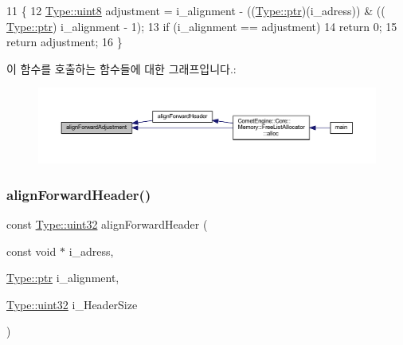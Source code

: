 \begin{DoxyCode}
11 \{
12     \hyperlink{namespace_comet_engine_1_1_type_a1b09856a6463f2bcc4bd8ff0e4e3ee0f}{Type::uint8} adjustment = i\_alignment - ((\hyperlink{namespace_comet_engine_1_1_type_aeb22ad46de677e9a50679dfebeb0e6f0}{Type::ptr})(i\_adress)) & ((
      \hyperlink{namespace_comet_engine_1_1_type_aeb22ad46de677e9a50679dfebeb0e6f0}{Type::ptr}) i\_alignment - 1);
13     \textcolor{keywordflow}{if} (i\_alignment == adjustment)
14         \textcolor{keywordflow}{return} 0;
15     \textcolor{keywordflow}{return} adjustment;
16 \}
\end{DoxyCode}
이 함수를 호출하는 함수들에 대한 그래프입니다.\+:
\nopagebreak
\begin{figure}[H]
\begin{center}
\leavevmode
\includegraphics[width=350pt]{namespace_comet_engine_1_1_core_1_1_memory_1_1_utils_aa5a0140d498d631a747be87791063f2d_icgraph}
\end{center}
\end{figure}
\mbox{\label{namespace_comet_engine_1_1_core_1_1_memory_1_1_utils_a57bbceefc56fa0e2ec1e472d85ce5e19}} 
\subsubsection{\texorpdfstring{align\+Forward\+Header()}{alignForwardHeader()}}
{\footnotesize\ttfamily const \hyperlink{namespace_comet_engine_1_1_type_ada4c95a4173a4bb540c8a7f80f3665d2}{Type\+::uint32} align\+Forward\+Header (\begin{DoxyParamCaption}\item[{const void $\ast$}]{i\+\_\+adress,  }\item[{\hyperlink{namespace_comet_engine_1_1_type_aeb22ad46de677e9a50679dfebeb0e6f0}{Type\+::ptr}}]{i\+\_\+alignment,  }\item[{\hyperlink{namespace_comet_engine_1_1_type_ada4c95a4173a4bb540c8a7f80f3665d2}{Type\+::uint32}}]{i\+\_\+\+Header\+Size }\end{DoxyParamCaption})}



